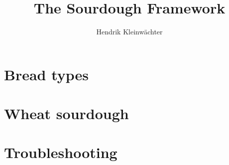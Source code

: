 \documentclass[paper=a4, twoside=false, fontsize=12pt, parskip=half,
                bibliography=totoc, listof=totoc]{scrbook}
\author{Hendrik Kleinwächter}
\title{The Sourdough Framework}
\begin{document}

\titlepage

\frontmatter
{%
\hypersetup{hidelinks}
\ifdefined\HCode\else\tableofcontents\fi
}





\mainmatter











\chapter{Bread types}


\chapter{Wheat sourdough}%
\label{chapter:wheat-sourdough}




% 




\chapter{Troubleshooting}


\backmatter

{%
\hypersetup{hidelinks}
\listofflowcharts
\listoftables
\listoffigures
}
\printbibliography
\end{document}
